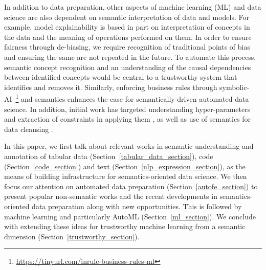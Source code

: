 \documentclass[sigconf, nonacm]{acmart}
\begin{document}
In addition to data preparation, other aspects of machine learning (ML) and data science are also dependent on semantic interpretation of data and models. For example, model explainability is based in part on interpretation of concepts in the data and the meaning of operations performed on them. In order to ensure fairness through de-biasing, we require recognition of traditional points of bias~\cite{mehrabi2021survey} and ensuring the same are not repeated in the future. To automate this process, semantic concept recognition and an understanding of the causal dependencies between identified concepts would be central to a trustworthy system that identifies and removes it. Similarly, enforcing business rules through symbolic-AI~\footnote{\url{https://tinyurl.com/inrule-business-rules-ml}}%
and semantics enhances the case for semantically-driven automated data science.  In addition, initial work has targeted understanding hyper-parameters and extraction of constraints in applying them \cite{hpodoc}, as well as use of semantics for data cleansing \cite{6982731}.  

In this paper, we first talk about relevant works in semantic understanding and annotation of tabular data (Section~\ref{tabular_data_section}), code (Section~\ref{code_section}) and text (Section~\ref{nlp_expression_section}), as the means of building infrastructure for semantics-oriented data science. 
We then focus our attention on automated data preparation (Section~\ref{autofe_section}) to present popular non-semantic works and the recent developments in semantics-oriented data preparation along with new opportunities. 
This is followed by machine learning and particularly AutoML (Section~\ref{ml_section}).
We conclude with extending these ideas for trustworthy machine learning from a semantic dimension (Section~\ref{trustworthy_section}). %
\end{document}
